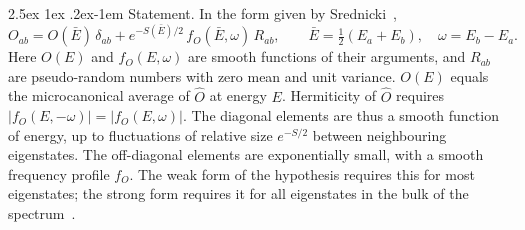 \documentclass[10pt,a4paper]{article}
\makeatletter
\renewcommand{\paragraph}{\@startsection{paragraph}{4}{\z@}%
  {2.5ex \@plus 1ex \@minus .2ex}{-1em}%
  {\normalfont\fontsize{14pt}{17pt}\selectfont\bfseries}}
\makeatother
\begin{document}
\paragraph{Statement.}
In the form given by Srednicki~\cite{Srednicki1999},
\begin{equation}
  O_{ab} = O(\bar E) \, \delta_{ab} + e^{-S(\bar E)/2} \, f_O(\bar E, \omega) \, R_{ab} ,
  \qquad
  \bar E = \tfrac12 (E_a + E_b) , \quad \omega = E_b - E_a .
  \label{eq:eth}
\end{equation}
Here $ O(E) $ and $ f_O(E,\omega) $ are smooth functions of their arguments, and $ R_{ab} $ are pseudo-random numbers with zero mean and unit variance.
$ O(E) $ equals the microcanonical average of $ \hat O $ at energy $ E $.
Hermiticity of $ \hat O $ requires $ |f_O(E,-\omega)| = |f_O(E,\omega)| $.
The diagonal elements are thus a smooth function of energy, up to fluctuations of relative size $ e^{-S/2} $ between neighbouring eigenstates.
The off-diagonal elements are exponentially small, with a smooth frequency profile $ f_O $.
The weak form of the hypothesis requires this for most eigenstates; the strong form requires it for all eigenstates in the bulk of the spectrum~\cite{Biroli2010,Kim2014}.
\end{document}
